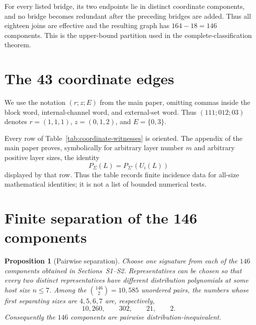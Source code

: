 \documentclass[10pt]{article}
\newtheorem{proposition}{Proposition}
\begin{document}
For every listed bridge, its two endpoints lie in distinct coordinate
components, and no bridge becomes redundant after the preceding bridges are
added.  Thus all eighteen joins are effective and the resulting graph has
$164-18=146$ components.  This is the upper-bound partition used in the
complete-classification theorem.

\section{The 43 coordinate edges}

We use the notation $(r;z;E)$ from the main paper, omitting commas inside the
block word, internal-channel word, and external-set word.  Thus
$(111;012;03)$ denotes $r=(1,1,1)$, $z=(0,1,2)$, and $E=\{0,3\}$.

Every row of Table~\ref{tab:coordinate-witnesses} is oriented.  The appendix
of the main paper proves, symbolically for arbitrary layer number $m$ and
arbitrary positive layer sizes, the identity
\[
P_{\Sigma}(L)=P_{\Sigma'}(U_i(L))
\]
displayed by that row.  Thus the table records finite incidence data for
all-size mathematical identities; it is not a list of bounded numerical
tests.

{\footnotesize
\setlength{\tabcolsep}{4pt}

}

\section{Finite separation of the 146 components}

\begin{proposition}[Pairwise separation]\label{prop:finite-separation}
Choose one signature from each of the $146$ components obtained in
Sections~S1--S2.  Representatives can be chosen so that every two distinct
representatives have different distribution polynomials at some host size
$n\le7$.  Among the $\binom{146}{2}=10{,}585$ unordered pairs, the numbers
whose first separating sizes are $4,5,6,7$ are, respectively,
\[
10{,}260,\qquad302,\qquad21,\qquad2.
\]
Consequently the $146$ components are pairwise distribution-inequivalent.
\end{proposition}
\end{document}
